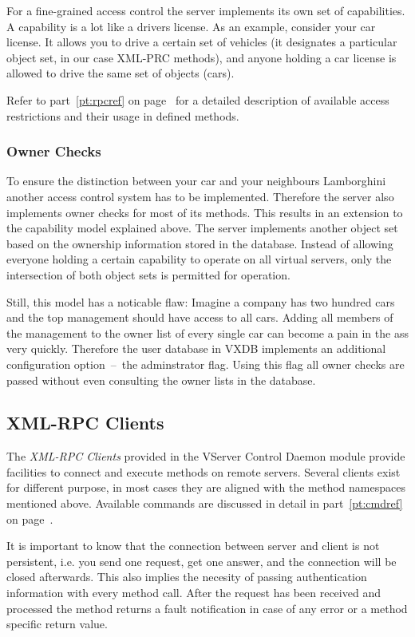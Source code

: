 For a fine-grained access control the server implements its own set of
capabilities.  A capability is a lot like a drivers license. As an example,
consider your car license. It allows you to drive a certain set of vehicles (it
designates a particular object set, in our case XML-PRC methods), and anyone
holding a car license is allowed to drive the same set of objects (cars).

Refer to part~\ref{pt:rpcref} on page~\pageref{pt:rpcref} for a detailed
description of available access restrictions and their usage in defined
methods.

\subsubsection{Owner Checks}

To ensure the distinction between your car and your neighbours Lamborghini
another access control system has to be implemented. Therefore the server also
implements owner checks for most of its methods. This results in an extension
to the capability model explained above. The server implements another object
set based on the ownership information stored in the database. Instead of
allowing everyone holding a certain capability to operate on all virtual
servers, only the intersection of both object sets is permitted for operation.

Still, this model has a noticable flaw: Imagine a company has two hundred cars
and the top management should have access to all cars. Adding all members of
the management to the owner list of every single car can become a pain in the
ass very quickly. Therefore the user database in VXDB implements an additional
configuration option~--~the adminstrator flag. Using this flag all owner checks
are passed without even consulting the owner lists in the database.


\subsection{XML-RPC Clients}

The \emph{XML-RPC Clients} provided in the VServer Control Daemon module
provide facilities to connect and execute methods on remote servers. Several
clients exist for different purpose, in most cases they are aligned with the
method namespaces mentioned above. Available commands are discussed in detail
in part~\ref{pt:cmdref} on page~\pageref{pt:cmdref}.

It is important to know that the connection between server and client is not
persistent, i.e. you send one request, get one answer, and the connection will
be closed afterwards. This also implies the necesity of passing authentication
information with every method call. After the request has been received and
processed the method returns a fault notification in case of any error or a
method specific return value.


